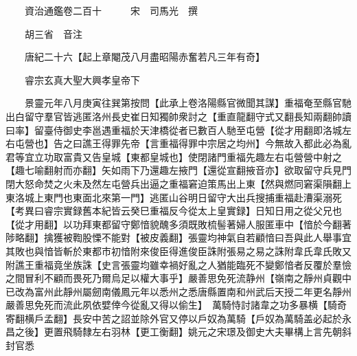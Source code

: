










 


 
 


 

  
  
  
  
  





  
  
  
  
  
 
  

  

  
  
  



  

 
 

  
   




  

  
  


  　　資治通鑑卷二百十　　　宋　司馬光　撰

　　胡三省　音注

　　唐紀二十六【起上章閹茂八月盡昭陽赤奮若凡三年有奇】

　　睿宗玄真大聖大興孝皇帝下

　　景靈元年八月庚寅往巽第按問【此承上卷洛陽縣官微聞其謀】重福奄至縣官馳出白留守羣官皆逃匿洛州長史崔日知獨帥衆討之【重直龍翻守式又翻長知兩翻帥讀曰率】留臺侍御史李邕遇重福於天津橋從者已數百人馳至屯營【從才用翻即洛城左右屯營也】告之曰譙王得罪先帝【言重福得罪中宗居之均州】今無故入都此必為亂君等宜立功取富貴又告皇城【東都皇城也】使閉諸門重福先趣左右屯營營中射之【趣七喻翻射而亦翻】矢如雨下乃還趣左掖門【還從宣翻掖音亦】欲取留守兵見門閉大怒命焚之火未及然左屯營兵出逼之重福窘迫策馬出上東【然與燃同窘渠隕翻上東洛城上東門也東面北來第一門】逃匿山谷明日留守大出兵搜捕重福赴漕渠溺死　【考異曰睿宗實録舊本紀皆云癸巳重福反今從太上皇實録】日知日用之從父兄也【從才用翻】以功拜東都留守鄭愔貌醜多須既敗梳髻著婦人服匿車中【愔於今翻著陟略翻】擒獲被鞫股慄不能對【被皮義翻】張靈均神氣自若顧愔曰吾與此人舉事宜其敗也與愔皆斬於東都市初愔附來俊臣得進俊臣誅附張易之易之誅附韋氏韋氏敗又附譙王重福竟坐族誅【史言張靈均雖幸禍好亂之人猶能臨死不變鄭愔者反覆於羣憸之間冒利不顧而畏死乃爾烏足以權大事乎】嚴善思免死流静州【嶺南之靜州貞觀中已改為富州此靜州屬劒南儀鳳元年以悉州之悉唐縣置南和州武后天授二年更名靜州嚴善思免死而流此夙依嬖倖今從亂又得以偷生】　萬騎恃討諸韋之功多暴横【騎奇寄翻横戶孟翻】長安中苦之詔並除外官又停以戶奴為萬騎【戶奴為萬騎盖必起於永昌之後】更置飛騎隸左右羽林【更工衡翻】姚元之宋璟及御史大夫畢構上言先朝斜封官悉

